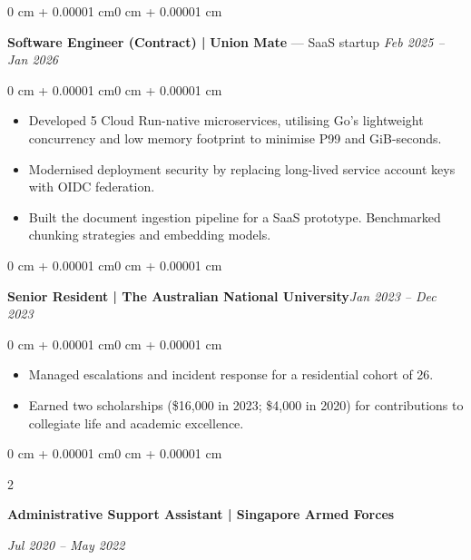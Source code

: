 \documentclass[10pt, letterpaper]{article}
\newenvironment{highlights}{
    \begin{itemize}[
        topsep=0.10 cm,
        parsep=0.10 cm,
        partopsep=0pt,
        itemsep=0pt,
        leftmargin=0 cm + 10pt
    ]
}{
    \end{itemize}
}
\newenvironment{onecolentry}{
    \begin{adjustwidth}{0 cm + 0.00001 cm}{0 cm + 0.00001 cm}
}{
    \end{adjustwidth}
}
\newenvironment{twocolentry}[2][]{
    \onecolentry
    \def\secondColumn{#2}
    \setcolumnwidth{\fill, 6 cm}
    \begin{paracol}{2}
}{
    \switchcolumn \raggedleft \secondColumn
    \end{paracol}
    \endonecolentry
}
\begin{document}
\vspace{0.2cm}

\begin{onecolentry}
    \textbf{Software Engineer (Contract) | }{\textbf{Union Mate}} — SaaS startup \hfill \textit{Feb 2025 – Jan 2026} \\
\end{onecolentry}

\vspace{0.1cm}

\begin{onecolentry}
    \begin{highlights}
        \item Developed 5 Cloud Run-native microservices, utilising Go's lightweight concurrency and low memory footprint to minimise P99 and GiB-seconds.
        \item Modernised deployment security by replacing long-lived service account keys with OIDC federation.
        \item Built the document ingestion pipeline for a SaaS prototype. Benchmarked chunking strategies and embedding models.
    \end{highlights}
\end{onecolentry}

\vspace{0.20 cm}

\begin{onecolentry}
    \textbf{Senior Resident | The Australian National University}\hfill \textit{Jan 2023 – Dec 2023}
\end{onecolentry}

\vspace{0.10 cm}

\begin{onecolentry}
    \begin{highlights}
        \item Managed escalations and incident response for a residential cohort of 26.
        \item Earned two scholarships (\$16,000 in 2023; \$4,000 in 2020) for contributions to collegiate life and academic excellence.
    \end{highlights}
\end{onecolentry}

\vspace{0.2 cm}

\begin{twocolentry}{\textit{Jul 2020 – May 2022}}
    \textbf{Administrative Support Assistant | Singapore Armed Forces}
\end{twocolentry}
\end{document}
